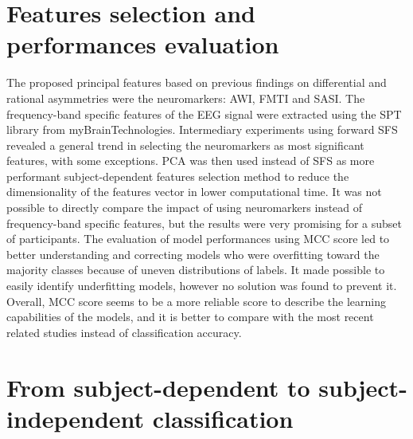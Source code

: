 \section{Features selection and performances evaluation}

The proposed principal features based on previous findings on differential and rational asymmetries were the neuromarkers: AWI, FMTI and SASI. The frequency-band specific features of the EEG signal were extracted using the SPT library from myBrainTechnologies. Intermediary experiments using forward SFS revealed a general trend in selecting the neuromarkers as most significant features, with some exceptions. PCA was then used instead of SFS as more performant subject-dependent features selection method to reduce the dimensionality of the features vector in lower computational time. It was not possible to directly compare the impact of using neuromarkers instead of frequency-band specific features, but the results were very promising for a subset of participants. The evaluation of model performances using MCC score led to better understanding and correcting models who were overfitting toward the majority classes because of uneven distributions of labels. It made possible to easily identify underfitting models, however no solution was found to prevent it. Overall, MCC score seems to be a more reliable score to describe the learning capabilities of the models, and it is better to compare with the most recent related studies instead of classification accuracy.

\section{From subject-dependent to subject-independent classification}

